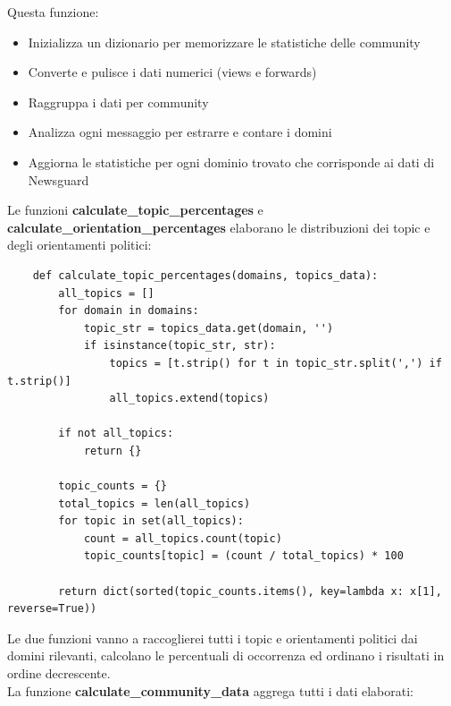 \documentclass[12pt]{article}
\begin{document}
	Questa funzione:
	\begin{itemize}[label=]
		\item Inizializza un dizionario per memorizzare le statistiche delle community
		\item Converte e pulisce i dati numerici (views e forwards)
		\item Raggruppa i dati per community
		\item Analizza ogni messaggio per estrarre e contare i domini
		\item Aggiorna le statistiche per ogni dominio trovato che corrisponde ai dati di Newsguard
	\end{itemize}
	Le funzioni \textbf{calculate\_topic\_percentages} e \textbf{calculate\_orientation\_percentages} elaborano le distribuzioni dei topic e degli orientamenti politici:
	\begin{lstlisting}
	def calculate_topic_percentages(domains, topics_data):
		all_topics = []
		for domain in domains:
			topic_str = topics_data.get(domain, '')
			if isinstance(topic_str, str):
				topics = [t.strip() for t in topic_str.split(',') if t.strip()]
				all_topics.extend(topics)
		
		if not all_topics:
			return {}
		
		topic_counts = {}
		total_topics = len(all_topics)
		for topic in set(all_topics):
			count = all_topics.count(topic)
			topic_counts[topic] = (count / total_topics) * 100
		
		return dict(sorted(topic_counts.items(), key=lambda x: x[1], reverse=True))
	\end{lstlisting}
	Le due funzioni vanno a raccoglierei tutti i topic e orientamenti politici dai domini rilevanti, calcolano le percentuali di occorrenza ed ordinano i risultati in ordine decrescente.\\
	La funzione \textbf{calculate\_community\_data} aggrega tutti i dati elaborati:
\end{document}
